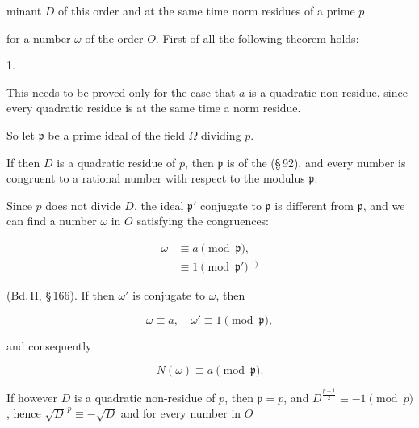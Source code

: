 minant $D$ of this order and at the same time norm residues of a prime $p$ 


for a number $\omega$ of the order $O$. First of all the following theorem holds:

1. 

This needs to be proved only for the case that $a$ is a quadratic non-residue, since every quadratic residue is at the same time a norm residue. %

So let $\mathfrak{p}$ be a prime ideal of the field $\Omega$ dividing $p$.

If then $D$ is a quadratic residue of $p$, then $\mathfrak{p}$ is of the  (\S\,92), and every number is congruent to a rational number with respect to the modulus $\mathfrak{p}$.

Since $p$ does not divide $D$, the ideal $\mathfrak{p}'$ conjugate to $\mathfrak{p}$ is different from $\mathfrak{p}$, and we can find a number $\omega$ in $O$ satisfying the congruences:

\[
\begin{aligned}
\omega &\equiv a \pmod{\mathfrak{p}},\\
&\equiv 1 \pmod{\mathfrak{p}'}\ ^{1)}
\end{aligned}
\]

(Bd.\,II, \S\,166). If then $\omega'$ is conjugate to $\omega$, then

\[ \omega \equiv a, \quad \omega' \equiv 1 \pmod{\mathfrak{p}}, \]

and consequently

\[ N(\omega) \equiv a \pmod{\mathfrak{p}}. \]

If however $D$ is a quadratic non-residue of $p$, then $\mathfrak{p} = p$, and $D^{\frac{p-1}{2}} \equiv -1 \pmod{p}$, hence $\sqrt{D}^{\,p} \equiv -\sqrt{D}$ %
and for every number in $O$


